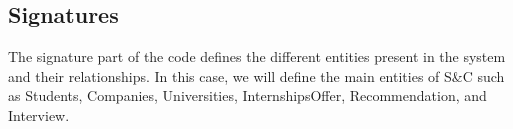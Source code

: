 \subsection{Signatures}
The signature part of the code defines the different entities present in the system and their relationships. In this case, we will define the main entities of S\&C such as Students, Companies, Universities, InternshipsOffer, Recommendation, and Interview. 

